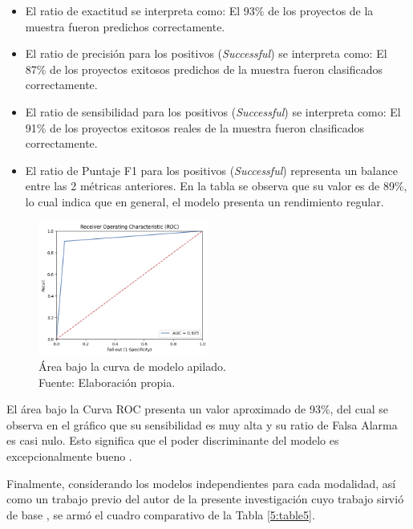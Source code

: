 \begin{itemize}
	\item El ratio de exactitud se interpreta como: El 93\% de los proyectos de la muestra fueron predichos correctamente.
	\item El ratio de precisión para los positivos (\textit{Successful}) se interpreta como: El 87\% de los proyectos exitosos predichos de la muestra fueron clasificados correctamente. 
	\item El ratio de sensibilidad para los positivos (\textit{Successful}) se interpreta como: El 91\% de los proyectos exitosos reales de la muestra fueron clasificados correctamente.
	\item El ratio de Puntaje F1 para los positivos (\textit{Successful}) representa un balance entre las 2 métricas anteriores. En la tabla se observa que su valor es de 89\%, lo cual indica que en general, el modelo presenta un rendimiento regular.
\end{itemize}

\begin{figure}[!ht]
	\begin{center}
		\includegraphics[width=0.50\textwidth]{5/figures/stacked_auc.png}
		\caption[Área bajo la curva de modelo apilado]{Área bajo la curva de modelo apilado.\\
		Fuente: Elaboración propia.}
		\label{5:fig12}
	\end{center}
\end{figure}

El área bajo la Curva ROC presenta un valor aproximado de 93\%, del cual se observa en el gráfico que su sensibilidad es muy alta y su ratio de Falsa Alarma es casi nulo. Esto significa que el poder discriminante del modelo es excepcionalmente bueno \parencite{bk_britos2006datamining}.

Finalmente, considerando los modelos independientes para cada modalidad, así como un trabajo previo del autor de la presente investigación cuyo trabajo sirvió de base \parencite{pr_puente2019kickstarter_prediction}, se armó el cuadro comparativo de la Tabla \ref{5:table5}.

